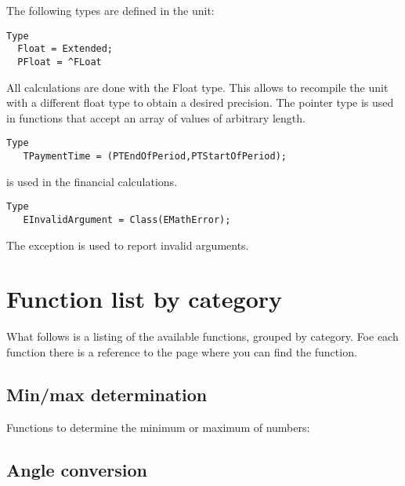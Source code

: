 The following types are defined in the  unit:
\begin{verbatim}
Type
  Float = Extended;
  PFloat = ^FLoat
\end{verbatim}
All calculations are done with the Float type. This allows to
recompile the unit with a different float type to obtain a
desired precision. The pointer type is used in functions that accept
an array of values of arbitrary length.
\begin{verbatim}
Type
   TPaymentTime = (PTEndOfPeriod,PTStartOfPeriod);
\end{verbatim}
 is used in the financial calculations.
\begin{verbatim}
Type
   EInvalidArgument = Class(EMathError);
\end{verbatim}
The  exception is used to report invalid arguments.

\section{Function list by category}
What follows is a listing of the available functions, grouped by category.
Foe each function there is a reference to the page where you can find the
function.
\subsection{Min/max determination}
Functions to determine the minimum or maximum of numbers:
\begin{funclist}
\end{funclist}
\subsection{Angle conversion}
\begin{funclist}
\end{funclist}
